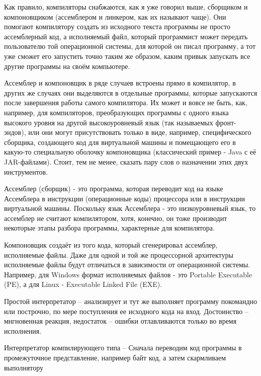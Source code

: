 \documentclass{article}
\begin{document}
Как правило, компиляторы снабжаются, как я уже говорил выше, сборщиком и компоновщиком (ассемблером и линкером, как их называют чаще). Они помогают компилятору создать из исходного текста программы не просто ассемблерный код, а исполняемый файл, который программист может передать пользователю той операционной системы, для которой он писал программу, а тот уже сможет его запустить точно таким же образом, каким привык запускать все другие программы на своём компьютере.

Ассемблер и компоновщик в ряде случаев встроены прямо в компилятор, в других же случаях они выделяются в отдельные программы, которые запускаются после завершения работы самого компилятора. Их может и вовсе не быть, как, например, для компиляторов, преобразующих программы с одного языка высокого уровня на другой высокоуровневый язык (так называемых фронт-эндов), или они могут присутствовать только в виде, например, специфического сборщика, создающего код для виртуальной машины и помещающего его в какую-то специальную оболочку компоновщика (классический пример - Java с её JAR-файлами). Стоит, тем не менее, сказать пару слов о назначении этих двух инструментов.

Ассемблер (сборщик) - это программа, которая переводит код на языке Ассемблера в инструкции (операционные коды) процессора или в инструкции виртуальной машины. Поскольку язык Ассемблера - это низкоуровневый язык, то ассемблер не считают компилятором, хотя, конечно, он тоже производит некоторые этапы разбора программы, характерные для компилятора.

Компоновщик создаёт из того кода, который сгенерировал ассемблер, исполняемые файлы. Даже для одной и той же процессорной архитектуры исполняемые файлы будут отличаться в зависимости от операционной системы. Например, для Windows формат исполняемых файлов - это Portable Executable (PE), а для Linux - Executable Linked File (EXE).


Простой интерпретатор -- анализирует и тут же выполняет программу покомандно или построчно, по мере поступления ее исходного кода на вход. Достоинство -- мнгновенная реакция, недостаток -- ошибки отлавливаются только во время исполнения.

Интерпретатор компилирующего типа -- Сначала переводим код программы в промежуточное представление, например байт код, а затем скармливаем выполнятору
\end{document}
